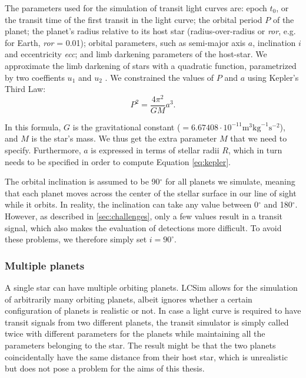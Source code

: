 The parameters used for the simulation of transit light curves are: epoch $t_0$, or the transit time of the first transit in the light curve; the orbital period $P$ of the planet; the planet’s radius relative to its host star (radius-over-radius or \textit{ror}, e.g. for Earth, \textit{ror} = 0.01); orbital parameters, such as semi-major axis $a$, inclination $i$ and eccentricity \textit{ecc}; and limb darkening parameters of the host-star. We approximate the limb darkening of stars with a quadratic function, parametrized by two coeffients $u_1$ and $u_2$ . We constrained the values of $P$ and $a$ using Kepler’s Third Law:
\begin{equation}
    \label{eq:kepler}
    P^2 = \frac{4 \pi^2}{GM}  a^3.
\end{equation}

In this formula, $G$ is the gravitational constant ($=6.67408 \cdot 10^{-11} \text{m}^3 \text{kg}^{-1} \text{s}^{-2}$), and $M$ is the star’s mass. We thus get the extra parameter $M$ that we need to specify. Furthermore, $a$ is expressed in terms of stellar radii $R$, which in turn needs to be specified in order to compute Equation \ref{eq:kepler}.

The orbital inclination is assumed to be 90$^\circ$ for all planets we simulate, meaning that each planet moves across the center of the stellar surface in our line of sight while it orbits. In reality, the inclination can take any value between 0$^\circ$ and 180$^\circ$. However, as described in \ref{sec:challenges}, only a few values result in a transit signal, which also makes the evaluation of detections more difficult. To avoid these problems, we therefore simply set $i = 90^\circ$.

\subsubsection{Multiple planets}
A single star can have multiple orbiting planets. LCSim allows for the simulation of arbitrarily many orbiting planets, albeit ignores whether a certain configuration of planets is realistic or not. In case a light curve is required to have transit signals from two different planets, the transit simulator is simply called twice with different parameters for the planets while maintaining all the parameters belonging to the star. The result might be that the two planets coincidentally have the same distance from their host star, which is unrealistic but does not pose a problem for the aims of this thesis. 

